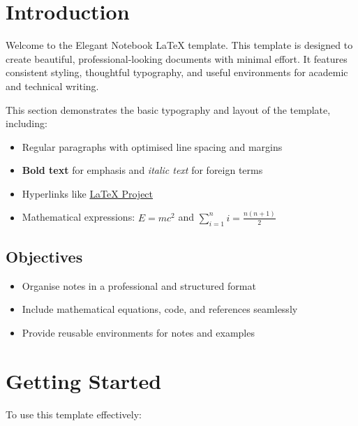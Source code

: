 \documentclass[a4paper,11pt]{article}
\begin{document}


\tableofcontents
\newpage

\section{Introduction}
Welcome to the Elegant Notebook LaTeX template. This template is designed to create beautiful, professional-looking documents with minimal effort. It features consistent styling, thoughtful typography, and useful environments for academic and technical writing.

This section demonstrates the basic typography and layout of the template, including:

\begin{itemize}
    \item Regular paragraphs with optimised line spacing and margins
    \item \textbf{Bold text} for emphasis and \textit{italic text} for foreign terms
    \item Hyperlinks like \href{https://www.latex-project.org/}{LaTeX Project}
    \item Mathematical expressions: $E = mc^2$ and $\sum_{i=1}^{n} i = \frac{n(n+1)}{2}$
\end{itemize}

\subsection{Objectives}
\begin{itemize}
    \item Organise notes in a professional and structured format
    \item Include mathematical equations, code, and references seamlessly
    \item Provide reusable environments for notes and examples
\end{itemize}

\section{Getting Started}
To use this template effectively:
\end{document}

